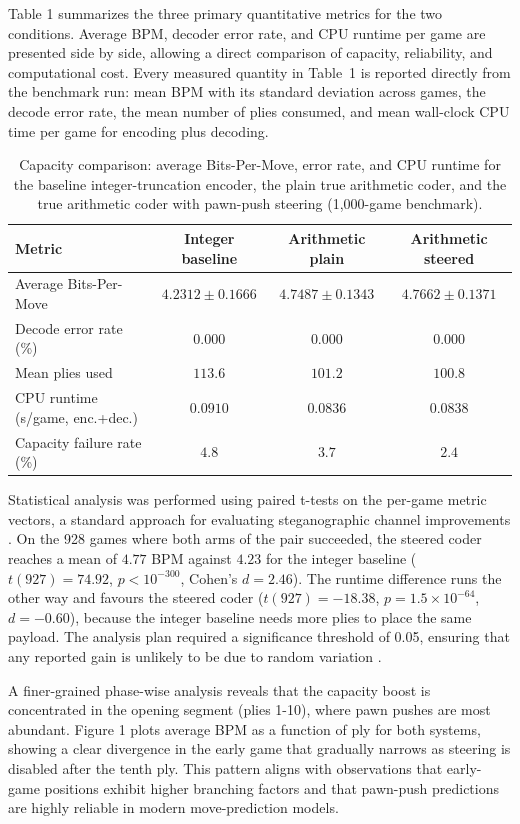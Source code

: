 \documentclass[journal]{IEEEtran}
\begin{document}
Table 1 summarizes the three primary quantitative metrics for the two conditions. Average BPM, decoder error rate, and CPU runtime per game are presented side by side, allowing a direct comparison of capacity, reliability, and computational cost. Every measured quantity in Table~1 is reported directly from the benchmark run: mean BPM with its standard deviation across games, the decode error rate, the mean number of plies consumed, and mean wall-clock CPU time per game for encoding plus decoding.

\begin{table}[t]
\centering
\caption{Capacity comparison: average Bits-Per-Move, error rate, and CPU runtime for the baseline integer-truncation encoder, the plain true arithmetic coder, and the true arithmetic coder with pawn-push steering (1{,}000-game benchmark).}
\label{tab:capacity-comparison}
\begin{tabular}{lccc}
\toprule
Metric & Integer baseline & Arithmetic plain & Arithmetic steered \\
\midrule
Average Bits-Per-Move & $4.2312 \pm 0.1666$ & $4.7487 \pm 0.1343$ & $4.7662 \pm 0.1371$ \\
Decode error rate (\%) & $0.000$ & $0.000$ & $0.000$ \\
Mean plies used & $113.6$ & $101.2$ & $100.8$ \\
CPU runtime (s/game, enc.+dec.) & $0.0910$ & $0.0836$ & $0.0838$ \\
Capacity failure rate (\%) & $4.8$ & $3.7$ & $2.4$ \\
\bottomrule
\end{tabular}
\end{table}

Statistical analysis was performed using paired t-tests on the per-game metric vectors, a standard approach for evaluating steganographic channel improvements . On the 928 games where both arms of the pair succeeded, the steered coder reaches a mean of $4.77$ BPM against $4.23$ for the integer baseline ($t(927) = 74.92$, $p < 10^{-300}$, Cohen's $d = 2.46$). The runtime difference runs the other way and favours the steered coder ($t(927) = -18.38$, $p = 1.5 \times 10^{-64}$, $d = -0.60$), because the integer baseline needs more plies to place the same payload. The analysis plan required a significance threshold of 0.05, ensuring that any reported gain is unlikely to be due to random variation \cite{shen2020nearimpercepti}.

A finer-grained phase-wise analysis reveals that the capacity boost is concentrated in the opening segment (plies 1-10), where pawn pushes are most abundant. Figure 1 plots average BPM as a function of ply for both systems, showing a clear divergence in the early game that gradually narrows as steering is disabled after the tenth ply. This pattern aligns with observations that early-game positions exhibit higher branching factors and that pawn-push predictions are highly reliable in modern move-prediction models.
\end{document}
